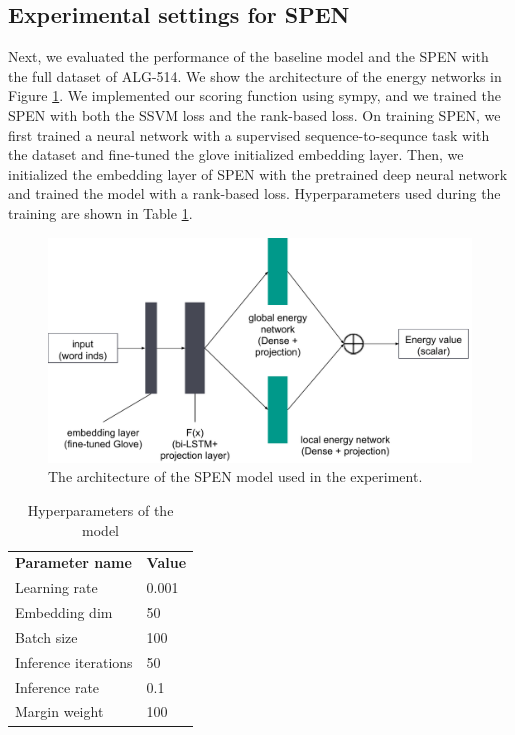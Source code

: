 \documentclass[11pt,letterpaper]{article}
\begin{document}
\subsection{Experimental settings for SPEN}
Next, we evaluated the performance of the baseline model and the SPEN with the full dataset of ALG-514. We show the architecture of the energy networks in Figure \ref{spen-architecture}. We implemented our scoring function using sympy, and we trained the SPEN with both the SSVM loss and the rank-based loss. On training SPEN, we first trained a neural network with a supervised sequence-to-sequnce task with the dataset and fine-tuned the glove initialized embedding layer. Then, we initialized the embedding layer of SPEN with the pretrained deep neural network and trained the model with a rank-based loss. Hyperparameters used during the training are shown in Table \ref{params}.
\begin{figure}[ht]
	\centering
	\includegraphics[bb=0 0 609 324, scale=0.4]{spen_architecture.pdf}
    \caption{The architecture of the SPEN model used in the experiment.}
    \label{spen-architecture}
\end{figure}
%
\begin{table}[]
\centering
\caption{Hyperparameters of the model}
\label{params}
\begin{tabular}{ll}
\textbf{Parameter name} & \textbf{Value} \\
Learning rate           & 0.001          \\
Embedding dim           & 50             \\
Batch size              & 100            \\
Inference iterations    & 50             \\
Inference rate          & 0.1            \\
Margin weight           & 100           
\end{tabular}
\end{table}
\end{document}
